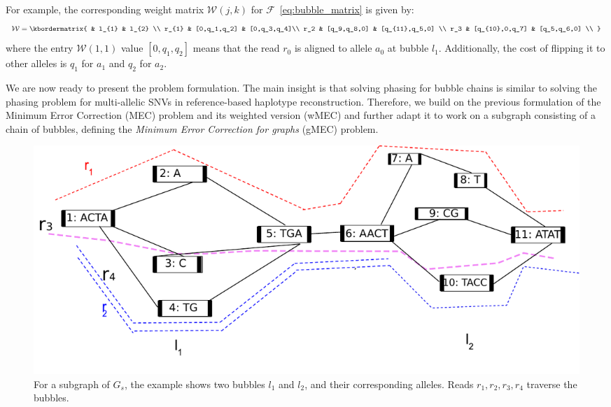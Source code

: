 For example, the corresponding weight matrix $\mathcal{W}(j,k)$ for $\mathcal{F}$~\eqref{eq:bubble_matrix} is given by:
\begin{equation}\label{eq:weight_matrix}
  \mathcal{W}  = \kbordermatrix{
     & l_{1}       & l_{2}  \\
    r_{1}       & [0,q_1,q_2] &  [0,q_3,q_4]\\
    r_2 & [q_9,q_8,0] & [q_{11},q_5,0] \\
    r_3 & [q_{10},0,q_7] & [q_5,q_6,0] \\
  }
\end{equation}
where the entry $\mathcal{W}(1,1)$ value $[0,q_1,q_2]$ means that the read $r_0$ is aligned to allele $a_0$ at bubble $l_1$.
Additionally, the cost of flipping it to other alleles is $q_1$ for $a_1$ and $q_2$ for $a_2$.

We are now ready to present the problem formulation.
The main insight is that solving phasing for bubble chains is similar to solving the phasing problem for multi-allelic SNVs in reference-based haplotype reconstruction.
Therefore, we build on the previous formulation of the Minimum Error Correction (MEC) problem \citep{Lancia2001} and its weighted version (wMEC) \citep{Lippert:2002ba,patterson2014whatshap} and further adapt it to work on a subgraph consisting of a chain of bubbles, defining the \emph{Minimum Error Correction for graphs} (gMEC) problem.

\begin{figure}[t!]\centering
\includegraphics[width=\columnwidth]{wmecfig.pdf}
\caption{For a subgraph of $G_s$, the example shows two bubbles $l_1$ and $l_2$, and their corresponding alleles. Reads $r_1,r_2,r_3,r_4$ traverse the bubbles.}
\label{fig:wmec}
\end{figure}

